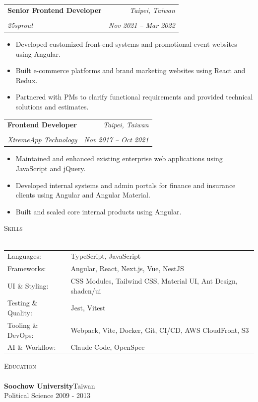 \documentclass[a4paper]{article}
\makeatletter
\newcommand{\lineunder} {
    \vspace*{-8pt} \\
    \hspace*{-18pt} \hrulefill \\
}
\newcommand{\header} [1] {
    {\hspace*{-18pt}\vspace*{6pt} \textsc{#1}}
    \vspace*{-6pt} \lineunder
}
\newcommand{\resumeSubheading}[4]{
    \Needspace{3.5\baselineskip}
    \noindent
    \begin{tabular*}{1.0\textwidth}[t]{l@{\extracolsep{\fill}}r}
      \textbf{\large #1} & \textit{\small #3} \\
      \vspace{-8pt} \\
      \textit{\large #2} & \textit{\small #4} \\
    \end{tabular*}%
    \par\vspace{2pt}
}
\makeatother
\begin{document}
\resumeSubheading
    {Senior Frontend Developer}
    {25sprout}
    {Taipei, Taiwan}
    {Nov 2021 – Mar 2022}
\vspace{-1mm}
\begin{itemize} \itemsep 1pt
    \item Developed customized front-end systems and promotional event websites using Angular.
    \item Built e-commerce platforms and brand marketing websites using React and Redux.
    \item Partnered with PMs to clarify functional requirements and provided technical solutions and estimates.
\end{itemize}

\resumeSubheading
    {Frontend Developer}
    {XtremeApp Technology}
    {Taipei, Taiwan}
    {Nov 2017 – Oct 2021}
\vspace{-1mm}
\begin{itemize} \itemsep 1pt
    \item Maintained and enhanced existing enterprise web applications using JavaScript and jQuery.
    \item Developed internal systems and admin portals for finance and insurance clients using Angular and Angular Material.
    \item Built and scaled core internal products using Angular.
\end{itemize}

\header{Skills}
\begin{tabular}{ l l }
    Languages: & TypeScript, JavaScript \\
    Frameworks: & Angular, React, Next.js, Vue, NestJS \\
    UI \& Styling: & CSS Modules, Tailwind CSS, Material UI, Ant Design, shadcn/ui \\
    Testing \& Quality: & Jest, Vitest \\
    Tooling \& DevOps: & Webpack, Vite, Docker, Git, CI/CD, AWS CloudFront, S3 \\
    AI \& Workflow: & Claude Code, OpenSpec \\
\end{tabular}
\vspace{2mm}

\header{Education}
\textbf{Soochow University}\hfill Taiwan\\
Political Science \hfill 2009 - 2013\\
\vspace{2mm}
\end{document}

